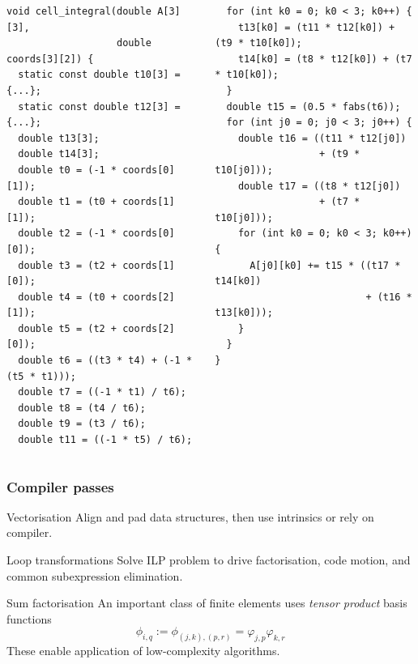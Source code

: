 \documentclass[presentation]{beamer}
\begin{document}
\begin{frame}[fragile]
\begin{overlayarea}{\textwidth}{0.8\textheight}
\begin{onlyenv}
\begin{columns}
      \begin{column}{0.5\textwidth}
\begin{verbatim}
void cell_integral(double A[3][3],
                   double coords[3][2]) {
  static const double t10[3] = {...};
  static const double t12[3] = {...};
  double t13[3];
  double t14[3];
  double t0 = (-1 * coords[0][1]);
  double t1 = (t0 + coords[1][1]);
  double t2 = (-1 * coords[0][0]);
  double t3 = (t2 + coords[1][0]);
  double t4 = (t0 + coords[2][1]);
  double t5 = (t2 + coords[2][0]);
  double t6 = ((t3 * t4) + (-1 * (t5 * t1)));
  double t7 = ((-1 * t1) / t6);
  double t8 = (t4 / t6);
  double t9 = (t3 / t6);
  double t11 = ((-1 * t5) / t6);
\end{verbatim}
      \end{column}
      \begin{column}{0.5\textwidth}
\begin{verbatim}
  for (int k0 = 0; k0 < 3; k0++) {
    t13[k0] = (t11 * t12[k0]) + (t9 * t10[k0]);
    t14[k0] = (t8 * t12[k0]) + (t7 * t10[k0]);
  }
  double t15 = (0.5 * fabs(t6));
  for (int j0 = 0; j0 < 3; j0++) {
    double t16 = ((t11 * t12[j0])
                  + (t9 * t10[j0]));
    double t17 = ((t8 * t12[j0])
                  + (t7 * t10[j0]));
    for (int k0 = 0; k0 < 3; k0++) {
      A[j0][k0] += t15 * ((t17 * t14[k0])
                          + (t16 * t13[k0]));
    }
  }
}
\end{verbatim}
      \end{column}
    \end{columns}
  \end{onlyenv}
  \end{overlayarea}
\end{frame}

\begin{frame}
  \frametitle{Compiler passes}
  \begin{block}{Vectorisation}
    Align and pad data structures, then use intrinsics or rely on
    compiler.
  \end{block}

  \begin{block}{Loop transformations}
    Solve ILP problem to drive factorisation, code motion, and common
    subexpression elimination.
  \end{block}

  \begin{block}{Sum factorisation}
    An important class of finite elements uses \emph{tensor product}
    basis functions
    \begin{equation*}
      \phi_{i,q} := \phi_{(j,k),(p,r)} = \varphi_{j,p}\varphi_{k,r}
    \end{equation*}
    These enable application of low-complexity algorithms.
  \end{block}
\end{frame}
\end{document}
